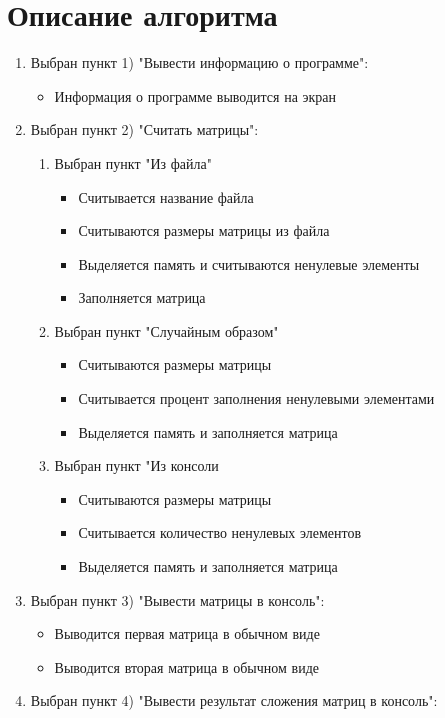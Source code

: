 \section{Описание алгоритма}
\begin{enumerate}
	\item Выбран пункт 1) "Вывести информацию о программе":
	\begin{itemize}
		\item Информация о программе выводится на экран
	\end{itemize}
	\item Выбран пункт 2) "Считать матрицы":
	\begin{enumerate}
		\item Выбран пункт "Из файла"
		\begin{itemize}
			\item Считывается название файла
			\item Считываются размеры матрицы из файла
			\item Выделяется память и считываются ненулевые элементы
			\item Заполняется матрица
		\end{itemize}
		\item Выбран пункт "Случайным образом"
		\begin{itemize}
			\item Считываются размеры матрицы
			\item Считывается процент заполнения ненулевыми элементами
			\item Выделяется память и заполняется матрица
		\end{itemize}
		\item Выбран пункт "Из консоли
		\begin{itemize}
			\item Считываются размеры матрицы
			\item Считывается количество ненулевых элементов
			\item Выделяется память и заполняется матрица
		\end{itemize}
	\end{enumerate}
	\item Выбран пункт 3) "Вывести матрицы в консоль":
	\begin{itemize}
		\item Выводится первая матрица в обычном виде
		\item Выводится вторая матрица в обычном виде
	\end{itemize}
	\item Выбран пункт 4) "Вывести результат сложения матриц в консоль":

\end{enumerate}
